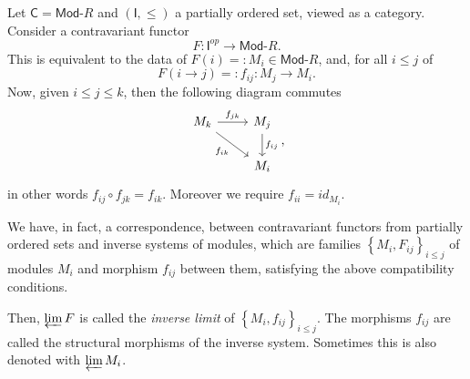 \begin{ex}
	Let $\mathsf{C} = \mathsf{Mod}\text{-}R$ and $\left( \mathsf{I}, \leq \right)$ a partially ordered set, viewed as a category.
	Consider a contravariant functor
	\begin{equation}
	F: \mathsf{I}^{op} \to \mathsf{Mod}\text{-}R
	.\end{equation} 
	This is equivalent to the data of $F(i) =: M_i \in \mathsf{Mod}\text{-}R$, and, for all $i \leq j$ of
	\begin{equation}
		F(i \to j) =: f_{ij}: M_j \to M_i
	.\end{equation} 
	Now, given $i \leq j \leq k$, then the following diagram commutes
	\begin{equation}
	\begin{tikzcd}
		M_k \arrow[r, "f_{jk}", rightarrow] \arrow[rd, "f_{ik}"', rightarrow] &
		M_j \arrow[d, "f_{ij}", rightarrow] \\
		& M_i
	\end{tikzcd}
	,\end{equation} 
	in other words $f_{ij} \circ f_{jk} = f_{ik}$.
	Moreover we require $f_{ii} = id_{M_i}$.

	We have, in fact, a correspondence, between contravariant functors from partially ordered sets and
	inverse systems of modules, which are families $\left\{ M_i, F_{ij} \right\}_{i \leq j}$ of modules $M_i$ and morphism $f_{ij}$ between them, satisfying the above compatibility conditions.

	Then, $\varprojlim F$ is called the {\em inverse limit} of $\left\{ M_i, f_{ij} \right\}_{i \leq j}$.
	The morphisms $f_{ij}$ are called the structural morphisms of the inverse system.
	Sometimes this is also denoted with $\varprojlim M_i$.
	

\end{ex}
